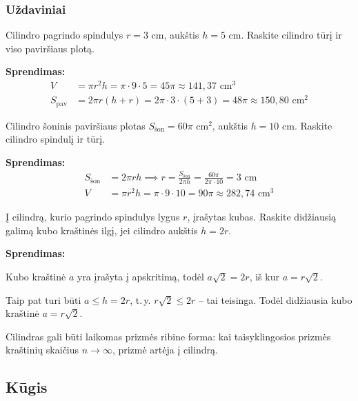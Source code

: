 \subsubsection*{Uždaviniai}

\begin{exercise}
Cilindro pagrindo spindulys $r = 3$ cm, aukštis $h = 5$ cm. Raskite cilindro tūrį ir viso paviršiaus plotą.

\textbf{Sprendimas:}
\begin{align*}
    V &= \pi r^2 h = \pi \cdot 9 \cdot 5 = 45\pi \approx 141{,}37 \text{ cm}^3 \\
    S_{\text{pav}} &= 2\pi r(h + r) = 2\pi \cdot 3 \cdot (5 + 3) = 48\pi \approx 150{,}80 \text{ cm}^2
\end{align*}
\end{exercise}

\begin{exercise}
Cilindro šoninis paviršiaus plotas $S_{\text{šon}} = 60\pi$ cm$^2$, aukštis $h = 10$ cm. Raskite cilindro spindulį ir tūrį.

\textbf{Sprendimas:}
\begin{align*}
    S_{\text{šon}} &= 2\pi r h \implies r = \frac{S_{\text{šon}}}{2\pi h} = \frac{60\pi}{2\pi \cdot 10} = 3 \text{ cm} \\
    V &= \pi r^2 h = \pi \cdot 9 \cdot 10 = 90\pi \approx 282{,}74 \text{ cm}^3
\end{align*}
\end{exercise}

\begin{exercise}
Į cilindrą, kurio pagrindo spindulys lygus $r$, įrašytas kubas. Raskite didžiausią galimą kubo kraštinės ilgį, jei cilindro aukštis $h = 2r$.

\textbf{Sprendimas:}

Kubo kraštinė $a$ yra įrašyta į apskritimą, todėl $a\sqrt{2} = 2r$, iš kur $a = r\sqrt{2}$.

Taip pat turi būti $a \leq h = 2r$, t.\,y. $r\sqrt{2} \leq 2r$ – tai teisinga. Todėl didžiausia kubo kraštinė $a = r\sqrt{2}$.
\end{exercise}

\begin{remark}
Cilindras gali būti laikomas prizmės ribine forma: kai taisyklingosios prizmės kraštinių skaičius $n \to \infty$, prizmė artėja į cilindrą.
\end{remark}

\subsection{Kūgis}

